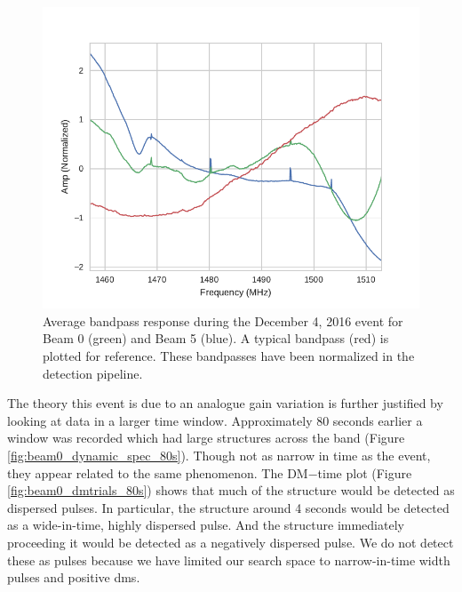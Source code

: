 \documentclass[a4paper,fleqn,usenatbib]{mnras}
\begin{document}
\begin{figure}
    \includegraphics[width=1.0\linewidth]{figures/bandpass_response.pdf}
    \caption{Average bandpass response during the December 4, 2016 event for
    Beam 0 (green) and Beam 5 (blue). A typical bandpass (red) is plotted for
    reference. These bandpasses have been normalized in the detection pipeline.
    }
    \label{fig:bandpass_response}
\end{figure}

The theory this event is due to an analogue gain variation is further justified
by looking at data in a larger time window.  Approximately 80 seconds earlier a
window was recorded which had large structures across the band (Figure
\ref{fig:beam0_dynamic_spec_80s}). Though not as narrow in time as the event,
they appear related to the same phenomenon.  The DM$-$time plot (Figure
\ref{fig:beam0_dmtrials_80s}) shows that much of the structure would be detected
as dispersed pulses.  In particular, the structure around 4 seconds would be
detected as a wide-in-time, highly dispersed pulse.  And the structure
immediately proceeding it would be detected as a negatively dispersed pulse.  We
do not detect these as pulses because we have limited our search space to
narrow-in-time width pulses and positive \glspl{dm}.
\end{document}
